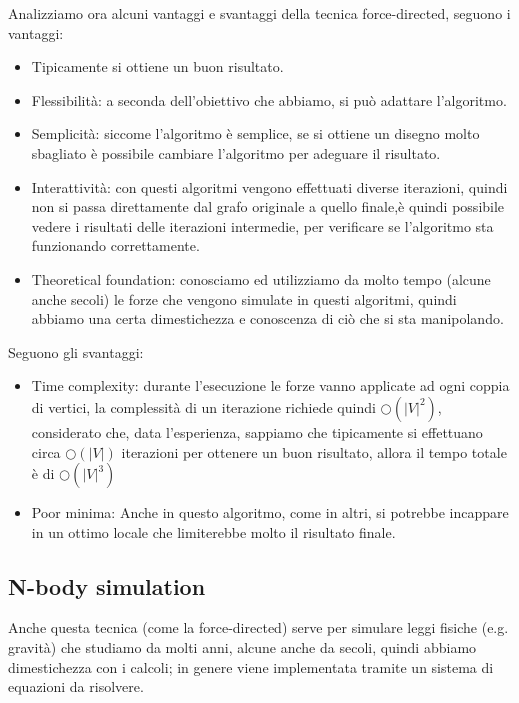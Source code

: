 \documentclass[12pt,a4paper]{article}
\begin{document}
Analizziamo ora alcuni vantaggi e svantaggi della tecnica force-directed, seguono i vantaggi:
\begin{itemize}
\item Tipicamente si ottiene un buon risultato.
\item Flessibilità: a seconda dell'obiettivo che abbiamo, si può adattare l'algoritmo.
\item Semplicità: siccome l'algoritmo è semplice, se si ottiene un disegno molto sbagliato è possibile cambiare l'algoritmo per adeguare il risultato.
\item Interattività: con questi algoritmi vengono effettuati diverse iterazioni, quindi non si passa direttamente dal grafo originale a quello finale,è quindi possibile vedere i risultati delle iterazioni intermedie, per verificare se l'algoritmo sta funzionando correttamente.
\item Theoretical foundation: conosciamo ed utilizziamo da molto tempo (alcune anche secoli) le forze che vengono simulate in questi algoritmi, quindi abbiamo una certa dimestichezza e conoscenza di ciò che si sta manipolando.
\end{itemize}
Seguono gli svantaggi:
\begin{itemize}
\item Time complexity: durante l'esecuzione le forze vanno applicate ad ogni coppia di vertici, la complessità di un iterazione richiede quindi $\bigcirc({\vert V \vert}^2)$, considerato che, data l'esperienza, sappiamo che tipicamente si effettuano circa $\bigcirc(\vert V \vert)$ iterazioni per ottenere un buon risultato, allora il tempo totale è di $\bigcirc({\vert V \vert}^3)$
\item Poor minima: Anche in questo algoritmo, come in altri, si potrebbe incappare in un ottimo locale che limiterebbe molto il risultato finale.
\end{itemize}

\subsection{N-body simulation}
Anche questa tecnica (come la force-directed) serve per simulare leggi fisiche (e.g. gravità) che studiamo da molti anni, alcune anche da secoli, quindi abbiamo dimestichezza con i calcoli; in genere viene implementata tramite un sistema di equazioni da risolvere.
\end{document}
